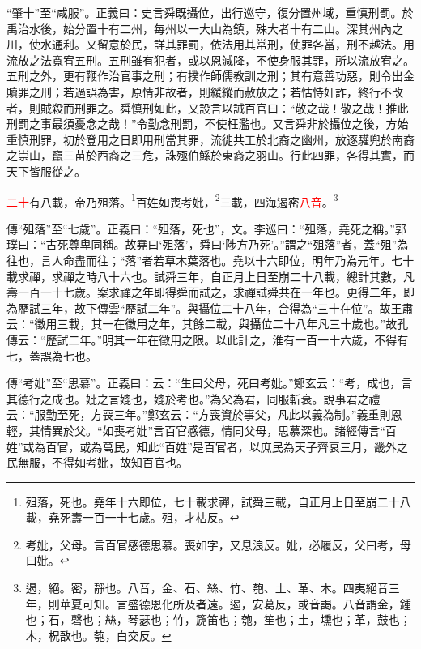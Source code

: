 {\noindent\shu{}\fzkt “肇十”至“咸服”。正義曰：史言舜既攝位，出行巡守，復分置州域，重慎刑罰。於禹治水後，始分置十有二州，每州以一大山為鎮，殊大者十有二山。深其州內之川，使水通利。又留意於民，詳其罪罰，依法用其常刑，使罪各當，刑不越法。用流放之法寬宥五刑。五刑雖有犯者，或以恩減降，不使身服其罪，所以流放宥之。五刑之外，更有鞭作治官事之刑；有撲作師儒教訓之刑；其有意善功惡，則令出金贖罪之刑；若過誤為害，原情非故者，則緩縱而赦放之；若怙恃奸詐，終行不改者，則賊殺而刑罪之。舜慎刑如此，又設言以誡百官曰：“敬之哉！敬之哉！推此刑罰之事最須憂念之哉！”令勤念刑罰，不使枉濫也。又言舜非於攝位之後，方始重慎刑罪，初於登用之日即用刑當其罪，流徙共工於北裔之幽州，放逐驩兜於南裔之崇山，竄三苗於西裔之三危，誅殛伯鯀於東裔之羽山。行此四罪，各得其實，而天下皆服從之。 \par}

\textcolor{red}{二十}有八載，帝乃殂落。\footnote{殂落，死也。堯年十六即位，七十載求禪，試舜三載，自正月上日至崩二十八載，堯死壽一百一十七歲。殂，才枯反。}百姓如喪考妣，\footnote{考妣，父母。言百官感德思慕。喪如字，又息浪反。妣，必履反，父曰考，母曰妣。}三載，四海遏密\textcolor{red}{八音}。\footnote{遏，絕。密，靜也。八音，金、石、絲、竹、匏、土、革、木。四夷絕音三年，則華夏可知。言盛德恩化所及者遠。遏，安葛反，或音謁。八音謂金，鍾也；石，磬也；絲，琴瑟也；竹，篪笛也；匏，笙也；土，壎也；革，鼓也；木，柷敔也。匏，白交反。}

{\noindent\zhuan{}\fzbyks 傳“殂落”至“七歲”。正義曰：“殂落，死也”，文。李巡曰：“殂落，堯死之稱。”郭璞曰：“古死尊卑同稱。故堯曰‘殂落’，舜曰‘陟方乃死’。”謂之“殂落”者，蓋“殂”為往也，言人命盡而往；“落”者若草木葉落也。堯以十六即位，明年乃為元年。七十載求禪，求禪之時八十六也。試舜三年，自正月上日至崩二十八載，總計其數，凡壽一百一十七歲。案求禪之年即得舜而試之，求禪試舜共在一年也。更得二年，即為歷試三年，故下傳雲“歷試二年”。與攝位二十八年，合得為“三十在位”。故王肅云：“徵用三載，其一在徵用之年，其餘二載，與攝位二十八年凡三十歲也。”故孔傳云：“歷試二年。”明其一年在徵用之限。以此計之，淮有一百一十六歲，不得有七，蓋誤為七也。 \par}

{\noindent\zhuan{}\fzbyks 傳“考妣”至“思慕”。正義曰：云：“生曰父母，死曰考妣。”鄭玄云：“考，成也，言其德行之成也。妣之言媲也，媲於考也。”為父為君，同服斬衰。說事君之禮云：“服勤至死，方喪三年。”鄭玄云：“方喪資於事父，凡此以義為制。”義重則恩輕，其情異於父。“如喪考妣”言百官感德，情同父母，思慕深也。諸經傳言“百姓”或為百官，或為萬民，知此“百姓”是百官者，以庶民為天子齊衰三月，畿外之民無服，不得如考妣，故知百官也。 \par}

